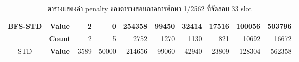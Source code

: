 \begin{table}[]
{\begin{tabular}{@{}ccrrrrrrrr@{}}
    \multirow{-2}{*}{BFS-STD}                    & \textbf{Value}                        & 2                              & 0                              & 254358                         & 99450                          & 32414                          & 17516                          & 100056                         & 503796                           \\ \midrule
                                                  & {\textbf{Count}} & {2}       & {5}       & {2752}    & {1270}    & {1130}    & {821}     & {10692}   & {16672}     \\ \cmidrule(l){2-10} 
    \multirow{-2}{*}{STD} & {\textbf{Value}} & {3589}    & {50000}   & {214656}  & {99060}   & {42940}   & {23809}   & {128304}  & {562358}    \\ \bottomrule
    \end{tabular}%
    }
    \caption{ตารางแสดงค่า penalty ของตารางสอบภาคการศึกษา 1/2562 ที่จัดสอบ 33 slot}
    \label{tab:result_table_162_33}
\end{table}
